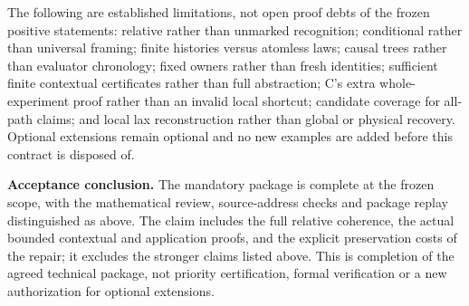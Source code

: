 \documentclass[11pt,a4paper]{article}
\theoremstyle{definition}
\begin{document}
The following are established limitations, not open proof debts of the
frozen positive statements: relative rather than unmarked recognition;
conditional rather than universal framing; finite histories versus
atomless laws; causal trees rather than evaluator chronology; fixed
owners rather than fresh identities; sufficient finite contextual
certificates rather than full abstraction; C's extra whole-experiment
proof rather than an invalid local shortcut; candidate coverage for
all-path claims; and local lax reconstruction rather than global or
physical recovery. Optional extensions remain optional and no new
examples are added before this contract is disposed of.

\textbf{Acceptance conclusion.} The mandatory package is complete at the
frozen scope, with the mathematical review, source-address checks and
package replay distinguished as above. The claim includes the full relative coherence, the actual bounded
contextual and application proofs, and the explicit preservation costs
of the repair; it excludes the stronger claims listed above. This is
completion of the agreed technical package, not priority certification,
formal verification or a new authorization for optional extensions.
\end{document}
